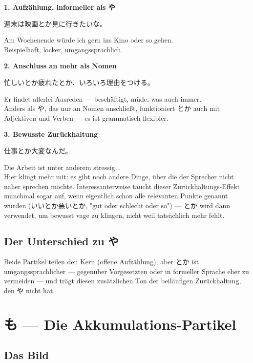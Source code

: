 \documentclass[12pt]{book}
\begin{document}
\textbf{1. Aufzählung, informeller als や}
\par\quad 週末は映画とか見に行きたいな。\\
\par\quad Am Wochenende würde ich gern ins Kino oder so gehen.\\

Beispielhaft, locker, umgangssprachlich.

\textbf{2. Anschluss an mehr als Nomen}
\par\quad 忙しいとか疲れたとか、いろいろ理由をつける。\\
\par\quad Er findet allerlei Ausreden — beschäftigt, müde, was auch immer.\\

Anders als や, das nur an Nomen anschließt, funktioniert とか auch mit Adjektiven und Verben — es ist grammatisch flexibler.

\textbf{3. Bewusste Zurückhaltung}
\par\quad 仕事とか大変なんだ。\\
\par\quad Die Arbeit ist unter anderem stressig...\\

Hier klingt mehr mit: es gibt noch andere Dinge, über die der Sprecher nicht näher sprechen möchte. Interessanterweise taucht dieser Zurückhaltungs-Effekt manchmal sogar auf, wenn eigentlich schon alle relevanten Punkte genannt wurden (いいとか悪いとか, "gut oder schlecht oder so") — とか wird dann verwendet, um bewusst vage zu klingen, nicht weil tatsächlich mehr fehlt.

\section*{Der Unterschied zu や}

Beide Partikel teilen den Kern (offene Aufzählung), aber とか ist umgangssprachlicher — gegenüber Vorgesetzten oder in formeller Sprache eher zu vermeiden — und trägt diesen zusätzlichen Ton der beiläufigen Zurückhaltung, den や nicht hat.


\chapter{も — Die Akkumulations-Partikel}

\section*{Das Bild}
\end{document}
